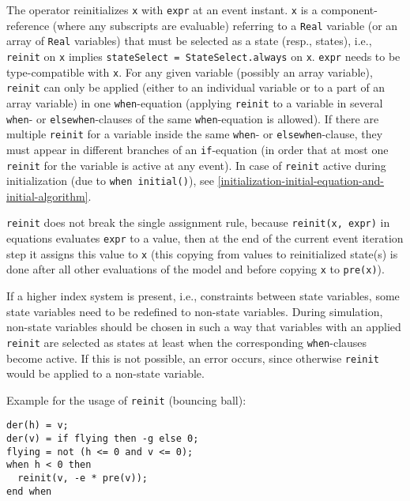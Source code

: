 The operator reinitializes \lstinline!x! with \lstinline!expr! at an event instant.
\lstinline!x! is a component-reference (where any subscripts are evaluable) referring to a \lstinline!Real! variable (or an array of \lstinline!Real! variables) that must be selected as a state (resp., states), i.e., \lstinline!reinit! on \lstinline!x! implies \lstinline!stateSelect = StateSelect.always! on \lstinline!x!.
\lstinline!expr! needs to be type-compatible with \lstinline!x!.
For any given variable (possibly an array variable), \lstinline!reinit! can only be applied (either to an individual variable or to a part of an array variable) in one \lstinline!when!-equation (applying \lstinline!reinit! to a variable in several \lstinline!when!- or \lstinline!elsewhen!-clauses of the same \lstinline!when!-equation is allowed).
If there are multiple \lstinline!reinit! for a variable inside the same \lstinline!when!- or \lstinline!elsewhen!-clause, they must appear in different branches of an \lstinline!if!-equation (in order that at most one \lstinline!reinit! for the variable is active at any event).
In case of \lstinline!reinit! active during initialization (due to \lstinline!when initial()!), see \cref{initialization-initial-equation-and-initial-algorithm}.

\lstinline!reinit! does not break the single assignment rule, because \lstinline!reinit(x, expr)! in equations evaluates \lstinline!expr! to a value,
then at the end of the current event iteration step it assigns this value to \lstinline!x! (this copying from values to reinitialized state(s) is done after all other evaluations of the model and before copying \lstinline!x! to \lstinline!pre(x)!).

\begin{example}
If a higher index system is present, i.e., constraints between state variables, some state variables need to be redefined to non-state variables.
During simulation, non-state variables should be chosen in such a way that variables with an applied \lstinline!reinit! are selected as states at least when the corresponding \lstinline!when!-clauses become active.
If this is not possible, an error occurs, since otherwise \lstinline!reinit! would be applied to a non-state variable.

Example for the usage of \lstinline!reinit! (bouncing ball):
\begin{lstlisting}[language=modelica]
der(h) = v;
der(v) = if flying then -g else 0;
flying = not (h <= 0 and v <= 0);
when h < 0 then
  reinit(v, -e * pre(v));
end when
\end{lstlisting}
\end{example}

